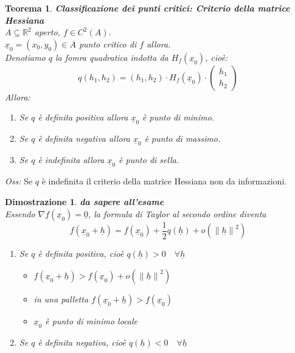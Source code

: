 \documentclass[10pt,landscape, a4paper]{article}
\newtheorem{teorema}{Teorema}
\newenvironment{thm}{\begin{mdframed}[backgroundcolor=white]\begin{teorema}}{\end{teorema}\end{mdframed}}
\newtheorem{demnstrn}{Dimostrazione}
\newenvironment{dimostrazione}{\begin{mdframed}[backgroundcolor=white]\begin{demnstrn}}{\end{demnstrn}\end{mdframed}}
\begin{document}
\begin{multicols}{3}
\begin{thm} \textbf{Classificazione dei punti critici: Criterio della matrice Hessiana}\\
	$A \subseteq \mathbb{R}^2$ aperto, $f \in C^2(A)$.\\
	$\underline{x}_0 = (x_0, y_0) \in A$ punto critico di $f$ allora.\\
	Denotiamo $q$ la fomra quadratica indotta da $H_f(\underline{x}_0)$, cioè:
	\begin{equation}
		q(h_1,h_2) = (h_1, h_2) \cdot H_f(\underline{x}_0) \cdot \begin{pmatrix} h_1 \\ h_2 \end{pmatrix}
	\end{equation}
	Allora:
	\begin{enumerate}
		\item[$i)$] Se $q$ è definita positiva allora $\underline{x}_0$ è punto di minimo.
		\item[$ii)$] Se $q$ è definita negativa allora $\underline{x}_0$ è punto di massimo.
		\item[$iii)$] Se $q$ è indefinita allora $\underline{x}_0$ è punto di sella.  
	\end{enumerate}
\end{thm}
\emph{Oss:} Se $q$ è indefinita il criterio della matrice Hessiana non da informazioni.
\begin{dimostrazione}
	\emph{\textbf{da sapere all'esame}}\\
	Essendo $\nabla f(\underline{x}_0) = \underline{0}$, la formula di Taylor al secondo ordine diventa
	\begin{equation}
		f(\underline{x}_0 + \underline{h}) = f(\underline{x}_0) + \frac{1}{2} q(\underline{h}) + o(\left\lVert \underline{h} \right\rVert^2)
	\end{equation}
	\begin{enumerate}
		\item[$i)$] Se $q$ è definita positiva, cioè $q(\underline{h})>0 \quad \forall \underline{h}$
			\begin{itemize}
				\item $f(\underline{x}_0 + \underline{h}) > f(\underline{x}_0) + o(\left\lVert \underline{h} \right\rVert^2)$
				\item in una palletta $f(\underline{x}_0 + \underline{h}) > f(\underline{x}_0)$
				\item $\underline{x}_0$ è punto di minimo locale
			\end{itemize}
		\item[$ii)$] Se $q$ è definita negativa, cioè $q(\underline{h})<0 \quad \forall \underline{h}$

\end{enumerate}
\end{dimostrazione}
\end{multicols}
\end{document}
